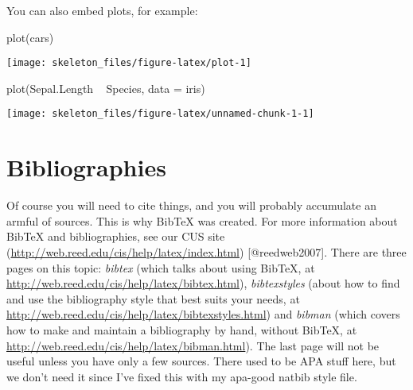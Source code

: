\documentclass[12pt,twoside]{reedthesis}
\begin{document}
  You can also embed plots, for example:
  
  \begin{CodeChunk}
  \begin{CodeInput}
  plot(cars)
  \end{CodeInput}
  
  
  \begin{center}\texttt{[image: skeleton\_files/figure-latex/plot-1]} \end{center}
  
  \end{CodeChunk}
  
  \begin{CodeChunk}
  \begin{CodeInput}
  plot(Sepal.Length ~ Species, data = iris)
  \end{CodeInput}
  
  
  \begin{center}\texttt{[image: skeleton\_files/figure-latex/unnamed-chunk-1-1]} \end{center}
  
  \end{CodeChunk}
  
  \section{Bibliographies}
  
  Of course you will need to cite things, and you will probably accumulate
  an armful of sources. This is why BibTeX was created. For more
  information about BibTeX and bibliographies, see our CUS site
  (\url{http://web.reed.edu/cis/help/latex/index.html})\cite{reedweb2007}
  {[}@reedweb2007{]}. There are three pages on this topic: \emph{bibtex}
  (which talks about using BibTeX, at
  \url{http://web.reed.edu/cis/help/latex/bibtex.html}),
  \emph{bibtexstyles} (about how to find and use the bibliography style
  that best suits your needs, at
  \url{http://web.reed.edu/cis/help/latex/bibtexstyles.html}) and
  \emph{bibman} (which covers how to make and maintain a bibliography by
  hand, without BibTeX, at
  \url{http://web.reed.edu/cis/help/latex/bibman.html}). The last page
  will not be useful unless you have only a few sources. There used to be
  APA stuff here, but we don't need it since I've fixed this with my
  apa-good natbib style file.

\printbibliography

\end{document}
